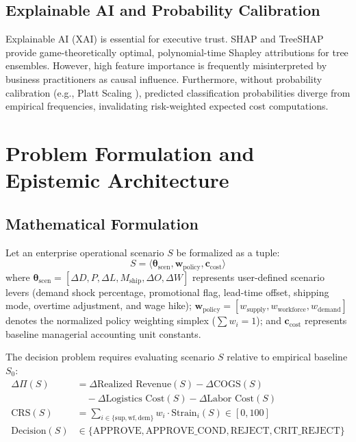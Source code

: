 \documentclass[conference]{IEEEtran}
\begin{document}
\subsection{Explainable AI and Probability Calibration}
Explainable AI (XAI) is essential for executive trust. SHAP and TreeSHAP \cite{lundberg2017unified, lundberg2020treeshap} provide game-theoretically optimal, polynomial-time Shapley attributions for tree ensembles. However, high feature importance is frequently misinterpreted by business practitioners as causal influence. Furthermore, without probability calibration (e.g., Platt Scaling \cite{platt1999probabilistic}), predicted classification probabilities diverge from empirical frequencies, invalidating risk-weighted expected cost computations.

\section{Problem Formulation and Epistemic Architecture}

\subsection{Mathematical Formulation}
Let an enterprise operational scenario $S$ be formalized as a tuple:
\begin{equation}
S = \langle \mathbf{\theta}_{\text{scen}}, \mathbf{w}_{\text{policy}}, \mathbf{c}_{\text{cost}} \rangle
\end{equation}
where $\mathbf{\theta}_{\text{scen}} = [\Delta D, P, \Delta L, M_{\text{ship}}, \Delta O, \Delta W]$ represents user-defined scenario levers (demand shock percentage, promotional flag, lead-time offset, shipping mode, overtime adjustment, and wage hike); $\mathbf{w}_{\text{policy}} = [w_{\text{supply}}, w_{\text{workforce}}, w_{\text{demand}}]$ denotes the normalized policy weighting simplex ($\sum w_i = 1$); and $\mathbf{c}_{\text{cost}}$ represents baseline managerial accounting unit constants.

The decision problem requires evaluating scenario $S$ relative to empirical baseline $S_0$:
\begin{align}
\Delta \Pi(S) &= \Delta \text{Realized Revenue}(S) - \Delta \text{COGS}(S) \nonumber \\
&\quad - \Delta \text{Logistics Cost}(S) - \Delta \text{Labor Cost}(S) \label{eq:profit} \\
\text{CRS}(S) &= \sum_{i \in \{\text{sup}, \text{wf}, \text{dem}\}} w_i \cdot \text{Strain}_i(S) \in [0, 100] \label{eq:crs} \\
\text{Decision}(S) &\in \{\text{APPROVE}, \text{APPROVE\_COND}, \text{REJECT}, \text{CRIT\_REJECT}\}
\end{align}
\end{document}
